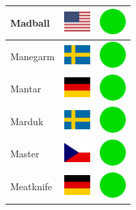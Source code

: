 \documentclass[12pt, a4paper, twoside]{report}
\begin{document}
\begin{center}
\begin{longtable}{|p{5cm}|p{2cm}|p{2cm}|}
			Madball & \includegraphics[width=1cm]{4x3/us} & \includegraphics[width=1cm]{likes/y} \\ \hline
			Manegarm & \includegraphics[width=1cm]{4x3/se} & \includegraphics[width=1cm]{likes/y} \\ \hline
			Mantar & \includegraphics[width=1cm]{4x3/de} & \includegraphics[width=1cm]{likes/y} \\ \hline
			Marduk & \includegraphics[width=1cm]{4x3/se} & \includegraphics[width=1cm]{likes/y} \\ \hline
			Master & \includegraphics[width=1cm]{4x3/cz} & \includegraphics[width=1cm]{likes/y} \\ \hline
			Meatknife & \includegraphics[width=1cm]{4x3/de} & \includegraphics[width=1cm]{likes/y} \\ \hline

\end{longtable}
\end{center}
\end{document}
